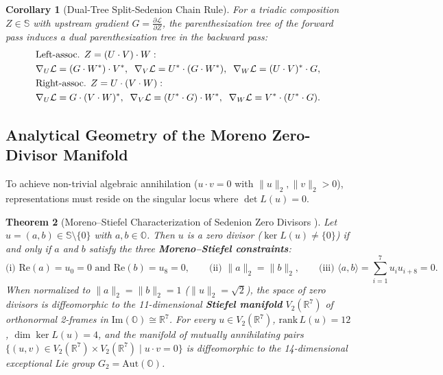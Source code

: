 \documentclass[11pt,a4paper]{article}
\newtheorem{theorem}{Theorem}[section]
\newtheorem{corollary}[theorem]{Corollary}
\theoremstyle{definition}
\theoremstyle{remark}
\newcommand{\R}{\mathbb{R}}
\newcommand{\Oc}{\mathbb{O}}
\newcommand{\Se}{\mathbb{S}}
\newcommand{\ImPart}{\mathrm{Im}}
\newcommand{\RePart}{\mathrm{Re}}
\newcommand{\Aut}{\mathrm{Aut}}
\newcommand{\rank}{\mathrm{rank}}
\begin{document}
\begin{corollary}[Dual-Tree Split-Sedenion Chain Rule]
\label{cor:dual_chain}
For a triadic composition $Z \in \Se$ with upstream gradient $G = \frac{\partial \mathcal{L}}{\partial Z}$, the parenthesization tree of the forward pass induces a dual parenthesization tree in the backward pass:
\begin{align}
&\text{Left-assoc. } Z = (U \cdot V) \cdot W: \notag\\ & \nabla_U \mathcal{L} = (G \cdot W^*) \cdot V^*, \;\; \nabla_V \mathcal{L} = U^* \cdot (G \cdot W^*), \;\; \nabla_W \mathcal{L} = (U \cdot V)^* \cdot G, \\
&\text{Right-assoc. } Z = U \cdot (V \cdot W): \notag\\ & \nabla_U \mathcal{L} = G \cdot (V \cdot W)^*, \;\; \nabla_V \mathcal{L} = (U^* \cdot G) \cdot W^*, \;\; \nabla_W \mathcal{L} = V^* \cdot (U^* \cdot G).
\end{align}
\end{corollary}

\subsection{Analytical Geometry of the Moreno Zero-Divisor Manifold}
To achieve non-trivial algebraic annihilation ($u \cdot v = 0$ with $\|u\|_2, \|v\|_2 > 0$), representations must reside on the singular locus where $\det L(u) = 0$.

\begin{theorem}[Moreno--Stiefel Characterization of Sedenion Zero Divisors \cite{Moreno1998}]
\label{thm:moreno}
Let $u = (a, b) \in \Se \setminus \{0\}$ with $a, b \in \Oc$. Then $u$ is a zero divisor ($\ker L(u) \neq \{0\}$) if and only if $a$ and $b$ satisfy the three \textbf{Moreno--Stiefel constraints}:
\begin{equation}
\label{eq:moreno_constraints}
\text{(i) } \RePart(a) = u_0 = 0 \text{ and } \RePart(b) = u_8 = 0, \qquad \text{(ii) } \|a\|_2 = \|b\|_2, \qquad \text{(iii) } \langle a, b \rangle = \sum_{i=1}^7 u_i u_{i+8} = 0.
\end{equation}
When normalized to $\|a\|_2 = \|b\|_2 = 1$ ($\|u\|_2 = \sqrt{2}$), the space of zero divisors is diffeomorphic to the 11-dimensional \textbf{Stiefel manifold} $V_2(\R^7)$ of orthonormal 2-frames in $\ImPart(\Oc) \cong \R^7$. For every $u \in V_2(\R^7)$, $\rank\,L(u) = 12$, $\dim \ker L(u) = 4$, and the manifold of mutually annihilating pairs $\{(u, v) \in V_2(\R^7) \times V_2(\R^7) \mid u \cdot v = 0\}$ is diffeomorphic to the 14-dimensional exceptional Lie group $G_2 = \Aut(\Oc)$.
\end{theorem}
\end{document}
